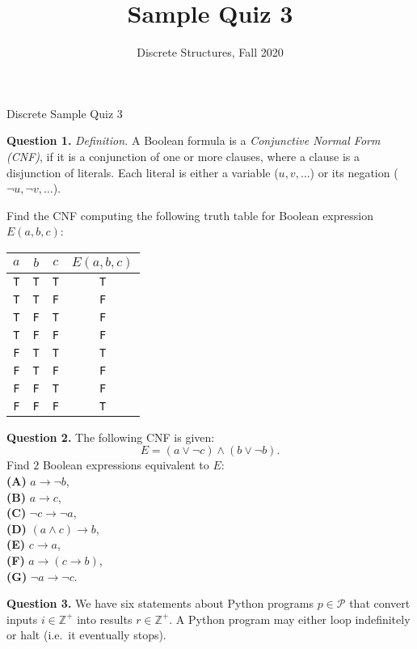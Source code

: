 \documentclass[jou]{apa6}
\title{Sample Quiz 3}
\author{Discrete Structures, Fall 2020}
\affiliation{RBS}
\begin{document}
\thispagestyle{empty}

\twocolumn
{\Large Discrete Sample Quiz 3}

\vspace{6pt}
{\bf Question 1.} {\em Definition.} A Boolean formula is a 
{\em Conjunctive Normal Form (CNF)}, 
if it is a conjunction of one or more clauses, 
where a clause is a disjunction of literals. Each literal 
is either a variable ($u,v,\ldots$) or its negation ($\neg u, \neg v, \ldots$). 

Find the CNF computing the following truth table for Boolean 
expression $E(a,b,c)$:\\
\begin{tabular}{ c | c | c | c }
$a$ & $b$ & $c$ & $E(a,b,c)$  \\ \hline
{\tt T} & {\tt T} & {\tt T} & {\tt T} \\ \hline
{\tt T} & {\tt T} & {\tt F} & {\tt F} \\ \hline
{\tt T} & {\tt F} & {\tt T} & {\tt F} \\ \hline
{\tt T} & {\tt F} & {\tt F} & {\tt F} \\ \hline
{\tt F} & {\tt T} & {\tt T} & {\tt T} \\ \hline
{\tt F} & {\tt T} & {\tt F} & {\tt F} \\ \hline
{\tt F} & {\tt F} & {\tt T} & {\tt F} \\ \hline
{\tt F} & {\tt F} & {\tt F} & {\tt T} \\ \hline
\end{tabular}




\vspace{6pt}
{\bf Question 2.} The following CNF is given:
$$E = (a \vee \neg c) \wedge (b \vee \neg b).$$
Find $2$ Boolean expressions equivalent to $E$:\\
{\bf (A)} $a \rightarrow \neg b$,\\
{\bf (B)} $a \rightarrow c$,\\
{\bf (C)} $\neg c \rightarrow \neg a$,\\
{\bf (D)} $(a \wedge c) \rightarrow b$,\\
{\bf (E)} $c \rightarrow a$,\\
{\bf (F)} $a \rightarrow (c \rightarrow b)$,\\
{\bf (G)} $\neg a \rightarrow \neg c$.

\vspace{6pt}
{\bf Question 3.} We have six statements about Python programs $p \in \mathcal{P}$
that convert inputs $i \in \mathbb{Z}^{+}$ into results $r \in \mathbb{Z}^{+}$.  
A Python program may either loop indefinitely or halt (i.e.\ it eventually stops).
\end{document}
